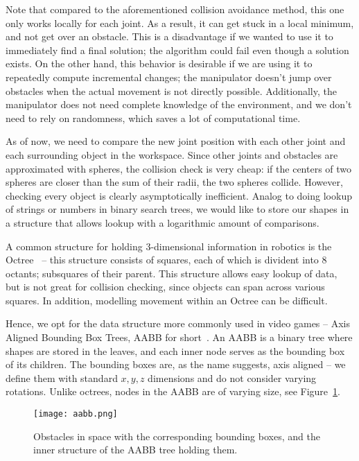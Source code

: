 Note that compared to the aforementioned collision avoidance method, this one only works locally for each joint. As a result, it can get stuck in a local minimum, and not get over an obstacle. This is a disadvantage if we wanted to use it to immediately find a final solution; the algorithm could fail even though a solution exists. On the other hand, this behavior is desirable if we are using it to repeatedly compute incremental changes; the manipulator doesn't jump over obstacles when the actual movement is not directly possible. Additionally, the manipulator does not need complete knowledge of the environment, and we don't need to rely on randomness, which saves a lot of computational time.

As of now, we need to compare the new joint position with each other joint and each surrounding object in the workspace. Since other joints and obstacles are approximated with spheres, the collision check is very cheap: if the centers of two spheres are closer than the sum of their radii, the two spheres collide. However, checking every object is clearly asymptotically inefficient. Analog to doing lookup of strings or numbers in binary search trees, we would like to store our shapes in a structure that allows lookup with a logarithmic amount of comparisons.

A common structure for holding 3-dimensional information in robotics is the Octree~\cite{octree} -- this structure consists of squares, each of which is divident into 8 octants; subsquares of their parent. This structure allows easy lookup of data, but is not great for collision checking, since objects can span across various squares. In addition, modelling movement within an Octree can be difficult.

Hence, we opt for the data structure more commonly used in video games -- Axis Aligned Bounding Box Trees, AABB for short~\cite{aabb}. An AABB is a binary tree where shapes are stored in the leaves, and each inner node serves as the bounding box of its children. The bounding boxes are, as the name suggests, axis aligned -- we define them with standard $x, y, z$ dimensions and do not consider varying rotations. Unlike octrees, nodes in the AABB are of varying size, see Figure~\ref{fig:aabb}.

\begin{figure}[h]
  \centering
  \texttt{[image: aabb.png]}
  \caption{Obstacles in space with the corresponding bounding boxes, and the inner structure of the AABB tree holding them.}\label{fig:aabb}
\end{figure}


